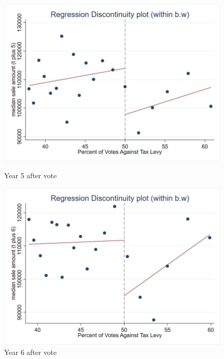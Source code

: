 \begin{figure}[ht]
    \centering
    \begin{minipage}[b]{0.48\textwidth}
        \centering
        \includegraphics[width=\textwidth,keepaspectratio]{images/rd_plot_median_sale_amount_t_plus_5_tri_mserd_1_2_within.png}
        \caption*{Year 5 after vote}
        \label{fig:hp_year5_after}
    \end{minipage}
    \hfill
    \begin{minipage}[b]{0.48\textwidth}
        \centering
        \includegraphics[width=\textwidth,keepaspectratio]{images/rd_plot_median_sale_amount_t_plus_6_tri_mserd_1_2_within.png}
        \caption*{Year 6 after vote}
        \label{fig:hp_year6_after}
    \end{minipage}
    

\end{figure}

